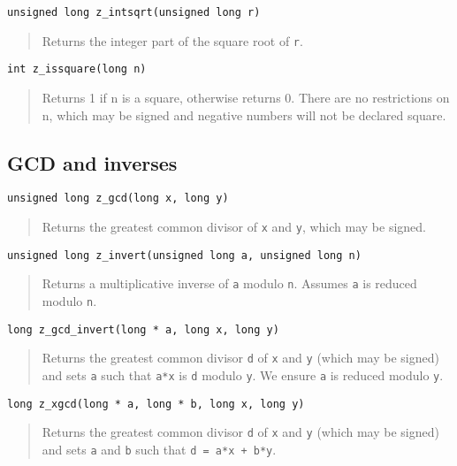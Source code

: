 \documentclass[a4paper,10pt]{article}
\newcommand{\code}{\lstinline}
\begin{document}
\begin{lstlisting}
unsigned long z_intsqrt(unsigned long r)
\end{lstlisting}
\begin{quote}
Returns the integer part of the square root of \code{r}. 
\end{quote}

\begin{lstlisting}
int z_issquare(long n)
\end{lstlisting}
\begin{quote}
Returns 1 if n is a square, otherwise returns 0. There are no restrictions on n, which may be signed and negative numbers will not be declared square. 
\end{quote}

\subsection{GCD and inverses}

\begin{lstlisting}
unsigned long z_gcd(long x, long y)
\end{lstlisting}
\begin{quote}
Returns the greatest common divisor of \code{x} and \code{y}, which may be signed.
\end{quote}

\begin{lstlisting}
unsigned long z_invert(unsigned long a, unsigned long n)
\end{lstlisting}
\begin{quote}
Returns a multiplicative inverse of \code{a} modulo \code{n}. Assumes \code{a} is reduced modulo \code{n}.
\end{quote}

\begin{lstlisting}
long z_gcd_invert(long * a, long x, long y)
\end{lstlisting}
\begin{quote}
Returns the greatest common divisor \code{d} of \code{x} and \code{y} (which may be signed) and sets \code{a} such that \code{a*x} is \code{d} modulo \code{y}. We ensure \code{a} is reduced modulo \code{y}.
\end{quote}

\begin{lstlisting}
long z_xgcd(long * a, long * b, long x, long y)
\end{lstlisting}
\begin{quote}
Returns the greatest common divisor \code{d} of \code{x} and \code{y} (which may be signed) and sets \code{a} and \code{b} such that \code{d = a*x + b*y}. 
\end{quote}
\end{document}
